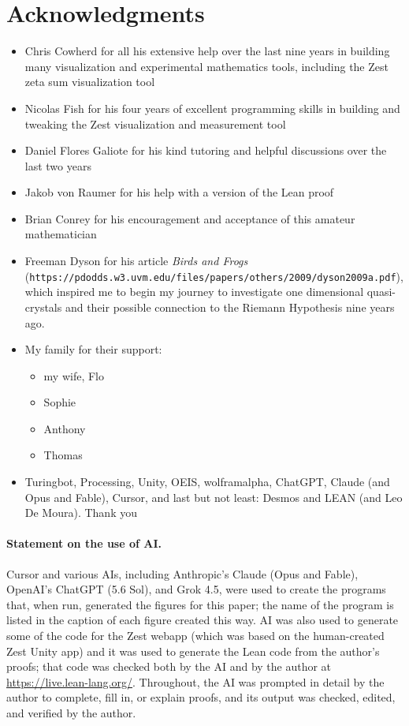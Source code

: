 \documentclass[11pt]{article}
\theoremstyle{definition}
\begin{document}
\section*{Acknowledgments}
\begin{itemize}
  \item Chris Cowherd for all his extensive help over the last nine years in building many visualization and experimental mathematics tools, including the Zest zeta sum visualization tool
  \item Nicolas Fish for his four years of excellent programming skills in building and tweaking the Zest visualization and measurement tool
  \item Daniel Flores Galiote for his kind tutoring and helpful discussions over the last two years
  \item Jakob von Raumer for his help with a version of the Lean proof
  \item Brian Conrey for his encouragement and acceptance of this amateur mathematician
  \item Freeman Dyson for his article {\it Birds and Frogs} \\(\texttt {\small https://pdodds.w3.uvm.edu/files/papers/others/2009/dyson2009a.pdf}), which inspired me to begin my journey to investigate one dimensional quasi-crystals and their possible connection to the Riemann Hypothesis nine years ago.
  \item My family for their support:
    \begin{itemize}
      \item my wife, Flo
      \item Sophie
      \item Anthony
      \item Thomas
    \end{itemize}
  \item Turingbot, Processing, Unity, OEIS, wolframalpha, ChatGPT, Claude (and Opus and Fable), Cursor, and last but not least: Desmos and LEAN (and Leo De Moura).  Thank you
\end{itemize}

\paragraph{Statement on the use of AI.}
Cursor and various AIs, including Anthropic's Claude (Opus and Fable),
OpenAI's ChatGPT (5.6 Sol), and Grok 4.5, were used to create the programs
that, when run, generated the figures for this paper; the name of the
program is listed in the caption of each figure created this way. AI was
also used to generate some of the code for the Zest webapp (which was based
on the human-created Zest Unity app) and it was used to generate the Lean
code from the author's proofs; that code was
checked both by the AI and by the author at
\url{https://live.lean-lang.org/}. Throughout, the AI was prompted in
detail by the author to complete, fill in, or explain proofs, and its
output was checked, edited, and verified by the author.
\end{document}
